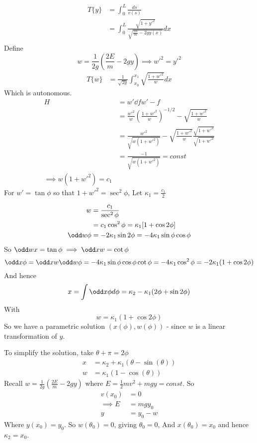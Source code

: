 \documentclass{E:/Documents/Latex/myassignment}
\begin{document}
\begin{align*}
	T\{y\} &= \int_0^L \frac{ds}{v(s)}\\
	&= \int_0^L \frac{\sqrt{1+y'^2}}{\sqrt{\frac{2E}{m} - 2gy(x)}}dx\\
\end{align*}
Define
\[w = \frac1{2g} \left(\frac{2E}{m} - 2gy\right) \implies w'^2 = y'^2\]
\begin{align*}
	T\{w\} &= \frac{1}{\sqrt{2g}}\int_{x_0}^{x_1} \sqrt{\frac{1+w'^2}{w}} dx
\end{align*}
Which is autonomous. 
\begin{align*}
	H &= w' \dd f{w'} - f \\
	&= \frac{w'^2}{w}\left(\frac{1+w'^2}{w}\right)^{-1/2}  -\sqrt{\frac{1+w'^2}{w}}\\
	&= \frac{w'^2}{\sqrt{w(1+w'^2)}} - \sqrt{\frac{1+w'^2}{w}} \frac{\sqrt{1+w'^2}}{\sqrt{1+w'^2}}\\
	&= \frac{-1}{\sqrt{w(1+w'^2)}} = const\\
	\implies w(1+w'^2) = c_1
\end{align*}
For $w' = \tan \phi$ so that $1+w'^2 = \sec^2\phi$, Let $\kappa_1 = \frac{c_1}{2}$

\begin{align*}
	w &= \frac{c_1}{\sec^2\phi}\\
	  &= c_1 \cos^2 \phi = \kappa_1 [1+\cos 2\phi]\\
	\odd w \phi &=	-2 \kappa_1 \sin 2\phi = -4 \kappa_1 \sin\phi \cos \phi
\end{align*}
So $\odd w x = \tan \phi \implies \odd xw = \cot \phi$
\[\odd x \phi = \odd x w\odd w \phi = -4 \kappa_1 \sin \phi \cos \phi \cot \phi = -4 \kappa_1 \cos^2 \phi = -2 \kappa_1 (1+ \cos 2\phi)\]
And hence
\[x = \int \odd x \phi d \phi = \kappa_2 - \kappa_1 (2\phi + \sin 2\phi)\]
With
\[w = \kappa_1 (1+\cos 2\phi)\] 
So we have a parametric solution $(x(\phi), w(\phi))$ - since $w$ is a linear transformation of $y$.

To simplify the solution, take $\theta + \pi = 2\phi$
\begin{align*}
	x &= \kappa_2 + \kappa_1(\theta - \sin(\theta))\\
	w &= \kappa_1 (1-\cos(\theta))
\end{align*}
Recall $w = \frac{1}{2g} (\frac{2E}{m} - 2gy)$ where $E = \frac12 mv^2 + mgy = const$. So
\begin{align*}
	v(x_0) &= 0\\
	\implies E &= mgy_0\\
	y &= y_0 -w
\end{align*}
Where $y(x_0) = y_0$. So $w(\theta_0) = 0$, giving $\theta_0 = 0$, And $x(\theta_0) = x_0$ and hence $\kappa_2 = x_0$.
\end{document}
